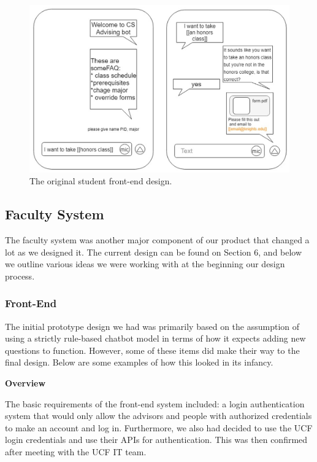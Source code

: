 \documentclass[titlepage, 12pt]{article}
\begin{document}
\begin{figure}[h]
    \centering\includegraphics[width=1\linewidth]{images/original-student-front.png}
    \caption{The original student front-end design.}
\end{figure}




\subsection{Faculty System}

The faculty system was another major component of our product that changed a lot as we designed it. The current design can be found on Section 6, and below we outline various ideas we were working with at the beginning our design process.

\subsubsection{Front-End}

The initial prototype design we had was primarily based on the assumption of using a strictly rule-based chatbot model in terms of how it expects adding new questions to function. However, some of these items did make their way to the final design. Below are some examples of how this looked in its infancy.

\textbf{Overview}

The basic requirements of the front-end system included: a login authentication system that would only allow the advisors and people with authorized credentials to make an account and log in. Furthermore, we also had decided to use the UCF login credentials and use their APIs for authentication. This was then confirmed after meeting with the UCF IT team.
\end{document}

